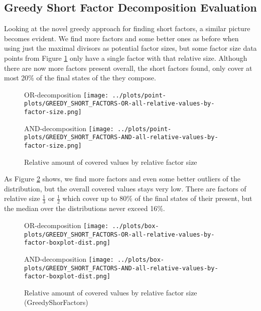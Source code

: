 \subsection{Greedy Short Factor Decomposition Evaluation}
Looking at the novel greedy approach for finding short factors, a similar picture becomes evident. We find more factors and some better ones as before when using just the maximal divisors as potential factor sizes, but some factor size data points from Figure \ref{fig:eval:greedy-short-factors-all-factors} only have a single factor with that relative size. Although there are now more factors present overall, the short factors found, only cover at most 20\% of the final states of the \DFA they compose.
\begin{figure}[h]
	\begin{minipage}[h]{0.49\linewidth}
		\centering
		OR-decomposition
		\texttt{[image: ../plots/point-plots/GREEDY\_SHORT\_FACTORS-OR-all-relative-values-by-factor-size.png]}
	\end{minipage}
	\begin{minipage}[h]{0.49\linewidth}
		\centering
		AND-decomposition
		\texttt{[image: ../plots/point-plots/GREEDY\_SHORT\_FACTORS-AND-all-relative-values-by-factor-size.png]}
	\end{minipage}
	\caption{Relative amount of covered values by relative factor size}
	\label{fig:eval:greedy-short-factors-all-factors}
\end{figure}
As Figure \ref{fig:eval:greedy-short-factors-all-factors-box-plot} shows, we find more factors and even some better outliers of the distribution, but the overall covered values stays very low. There are factors of relative size $\frac{1}{3}$ or $\frac{1}{2}$ which cover up to 80\% of the final states of their \DFA present, but the median over the distributions never exceed 16\%. 
\begin{figure}[t]
	\begin{minipage}[h]{0.49\linewidth}
		\centering
		OR-decomposition
		\texttt{[image: ../plots/box-plots/GREEDY\_SHORT\_FACTORS-OR-all-relative-values-by-factor-boxplot-dist.png]}
	\end{minipage}
	\begin{minipage}[h]{0.49\linewidth}
		\centering
		AND-decomposition
		\texttt{[image: ../plots/box-plots/GREEDY\_SHORT\_FACTORS-AND-all-relative-values-by-factor-boxplot-dist.png]}
	\end{minipage}
	\caption{Relative amount of covered values by relative factor size (GreedyShorFactors)}
	\label{fig:eval:greedy-short-factors-all-factors-box-plot}
\end{figure}

